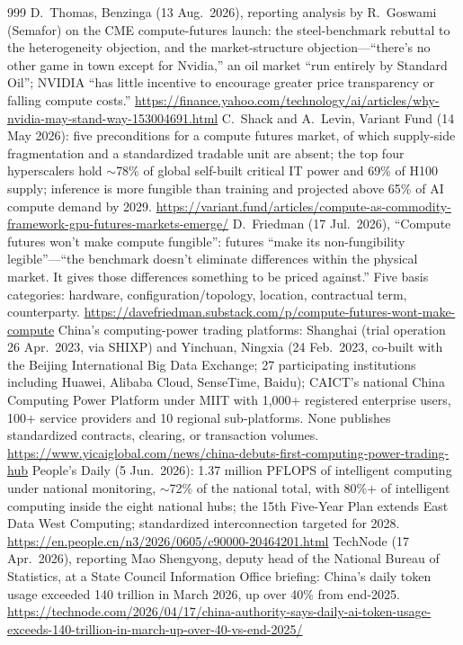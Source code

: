 \begin{thebibliography}{999}
 D.~Thomas, Benzinga (13 Aug.\ 2026), reporting analysis by R.~Goswami (Semafor) on the CME compute-futures launch: the steel-benchmark rebuttal to the heterogeneity objection, and the market-structure objection---``there's no other game in town except for Nvidia,'' an oil market ``run entirely by Standard Oil''; NVIDIA ``has little incentive to encourage greater price transparency or falling compute costs.'' \url{https://finance.yahoo.com/technology/ai/articles/why-nvidia-may-stand-way-153004691.html}
 C.~Shack and A.~Levin, Variant Fund (14 May 2026): five preconditions for a compute futures market, of which supply-side fragmentation and a standardized tradable unit are absent; the top four hyperscalers hold $\sim$78\% of global self-built critical IT power and 69\% of H100 supply; inference is more fungible than training and projected above 65\% of AI compute demand by 2029. \url{https://variant.fund/articles/compute-as-commodity-framework-gpu-futures-markets-emerge/}
 D.~Friedman (17 Jul.\ 2026), ``Compute futures won't make compute fungible'': futures ``make its non-fungibility legible''---``the benchmark doesn't eliminate differences within the physical market. It gives those differences something to be priced against.'' Five basis categories: hardware, configuration/topology, location, contractual term, counterparty. \url{https://davefriedman.substack.com/p/compute-futures-wont-make-compute}
 China's computing-power trading platforms: Shanghai (trial operation 26 Apr.\ 2023, via SHIXP) and Yinchuan, Ningxia (24 Feb.\ 2023, co-built with the Beijing International Big Data Exchange; 27 participating institutions including Huawei, Alibaba Cloud, SenseTime, Baidu); CAICT's national China Computing Power Platform under MIIT with 1,000+ registered enterprise users, 100+ service providers and 10 regional sub-platforms. None publishes standardized contracts, clearing, or transaction volumes. \url{https://www.yicaiglobal.com/news/china-debuts-first-computing-power-trading-hub}
 People's Daily (5 Jun.\ 2026): 1.37 million PFLOPS of intelligent computing under national monitoring, $\sim$72\% of the national total, with 80\%+ of intelligent computing inside the eight national hubs; the 15th Five-Year Plan extends East Data West Computing; standardized interconnection targeted for 2028. \url{https://en.people.cn/n3/2026/0605/c90000-20464201.html}
 TechNode (17 Apr.\ 2026), reporting Mao Shengyong, deputy head of the National Bureau of Statistics, at a State Council Information Office briefing: China's daily token usage exceeded 140 trillion in March 2026, up over 40\% from end-2025. \url{https://technode.com/2026/04/17/china-authority-says-daily-ai-token-usage-exceeds-140-trillion-in-march-up-over-40-vs-end-2025/}

\end{thebibliography}
